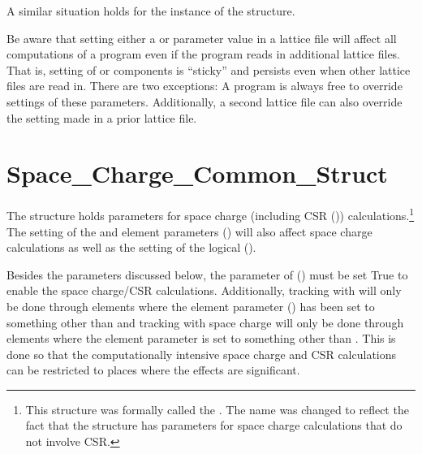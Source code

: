 {A similar situation holds for the  instance of the  structure.

Be aware that setting either a  or  parameter value in a lattice file will
affect all computations of a program even if the program reads in additional lattice files. That is,
setting of  or  components is ``sticky'' and persists even when other
lattice files are read in. There are two exceptions: A program is always free to override settings
of these parameters.  Additionally, a second lattice file can also override the setting made in a
prior lattice file.

\section{Space_Charge_Common_Struct}
\label{s:sc.com}

The  structure holds parameters for space charge (including CSR
()) calculations.\footnote
  {
This structure was formally called the . The name was changed to reflect
the fact that the structure has parameters for space charge calculations that do not involve CSR.
  }
The setting of the  and  element parameters
() will also affect space charge calculations as well as the setting of the
 logical  ().

Besides the parameters discussed below, the  parameter of 
() must be set True to enable the space charge/CSR calculations. Additionally,
tracking with  will only be done through elements where the element parameter
 () has been set to something other than  and tracking with
space charge will only be done through elements where the element parameter 
is set to something other than . This is done so that the computationally intensive space
charge and CSR calculations can be restricted to places where the effects are significant.

}
